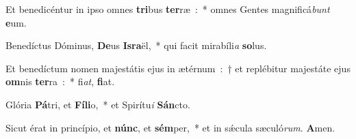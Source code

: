 \item Et benedicéntur in ipso omnes \textbf{tri}bus \textbf{ter}ræ~:~* omnes Gentes magnificá\emph{bunt} \textbf{e}um.
\item Benedíctus Dóminus, \textbf{De}us \textbf{Is}\textbf{ra}ël,~* qui facit mirabíli\emph{a} \textbf{so}lus.
\item Et benedíctum nomen majestátis ejus in ætérnum~:~† et replébitur majestáte ejus \textbf{om}nis \textbf{ter}ra~:~* fi\emph{at}, \textbf{fi}at.
\item Glória \textbf{Pá}tri, et \textbf{Fí}\textbf{li}o,~* et Spirítu\emph{i} \textbf{Sán}cto.
\item Sicut érat in princípio, et \textbf{núnc}, et \textbf{sém}per,~* et in sǽcula sæculó\emph{rum}. \textbf{A}men.